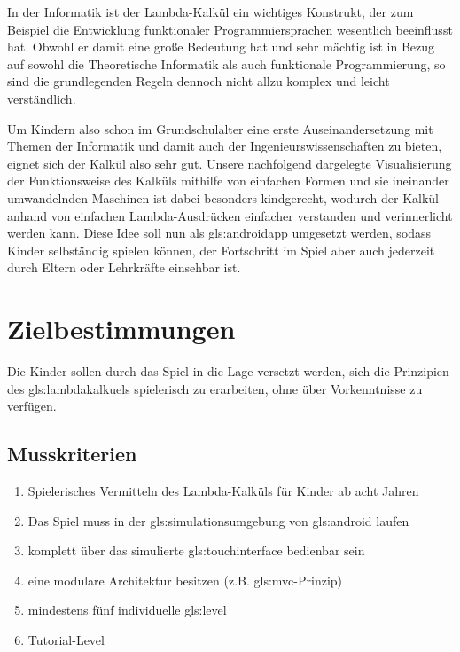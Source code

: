 \documentclass{scrartcl}
\begin{document}
In der Informatik ist der Lambda-Kalkül ein wichtiges Konstrukt, der
zum Beispiel die Entwicklung funktionaler Programmiersprachen wesentlich
beeinflusst hat. Obwohl er damit eine große Bedeutung hat und sehr
mächtig ist in Bezug auf sowohl die Theoretische Informatik als auch
funktionale Programmierung, so sind die grundlegenden Regeln dennoch
nicht allzu komplex und leicht verständlich. 

Um Kindern also schon im Grundschulalter eine erste Auseinandersetzung
mit Themen der Informatik und damit auch der Ingenieurswissenschaften
zu bieten, eignet sich der Kalkül also sehr gut. Unsere nachfolgend
dargelegte Visualisierung der Funktionsweise des Kalküls mithilfe
von einfachen Formen und sie ineinander umwandelnden Maschinen ist
dabei besonders kindgerecht, wodurch der Kalkül anhand von einfachen
Lambda-Ausdrücken einfacher verstanden und verinnerlicht werden kann.
Diese Idee soll nun als \gls{gls:androidapp} umgesetzt werden, sodass Kinder
selbständig spielen können, der Fortschritt im Spiel aber auch jederzeit
durch Eltern oder Lehrkräfte einsehbar ist. 

\clearpage









\section{Zielbestimmungen}


Die Kinder sollen durch das Spiel in die Lage versetzt werden, sich die Prinzipien des \gls{gls:lambdakalkuel}s spielerisch zu erarbeiten, ohne über Vorkenntnisse zu verfügen.

\subsection{Musskriterien}

\begin{enumerate}
	\item \label{muss:vermittelnlamba}Spielerisches Vermitteln des Lambda-Kalküls für Kinder ab acht Jahren
	\item \label{muss:simulationandroid}Das Spiel muss in der \gls{gls:simulationsumgebung} von \gls{gls:android} laufen
	\item \label{muss:touchinterface}komplett über das simulierte \gls{gls:touchinterface} bedienbar sein
	\item \label{muss:mvc}eine modulare Architektur besitzen (z.B. \gls{gls:mvc}-Prinzip)
	\item \label{muss:5indilevel}mindestens fünf individuelle \gls{gls:level}
	\item \label{muss:tutorial}Tutorial-Level
\end{enumerate}
\end{document}
